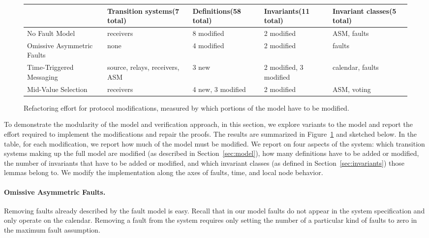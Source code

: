 \documentclass{llncs/llncs}
\newcommand{\lee}[1]{ } %
\newcommand{\lee}[1]{ {\color{blue}$<$lee: #1$>$} } %
\begin{document}
{\begin{figure}
  \centering
  \begin{tabular}{|p{3cm}|p{2cm}|p{2cm}|p{2cm}|p{2cm}|}
  \hline
                                  & Transition systems\linebreak (7 total)  &Definitions\linebreak (58 total) & Invariants\linebreak (11 total) & Invariant classes\linebreak (5 total) \\
  \hline \hline
  No Fault Model                  & receivers & 8 modified & 2 modified & ASM, faults \\
  \hline
  Omissive Asymmetric Faults       & none      & 4 modified & 2 modified & faults             \\
  \hline
  Time-Triggered Messaging        & source, relays, receivers, ASM & 3 new & 2 modified, 3 modified & calendar, faults \\
  \hline
  Mid-Value Selection & receivers & 4 new, 3 modified & 2 modified & ASM, voting \\
  \hline
  \end{tabular}
  \caption{Refactoring effort for protocol modifications, measured by which portions of the model have to be modified.}
  \label{fig:effort}
\end{figure}

To demonstrate the modularity of the model and verification approach, in this section, we explore variants to the model and report the effort required to implement the modifications and repair the proofs. The results are summarized in Figure~\ref{fig:effort} and sketched below. In the table, for each modification, we report how much of the model must be modified. We report on four aspects of the system: which transition systems making up the full model are modified (as described in Section~\ref{sec:model}), how many definitions have to be added or modified, the number of invariants that have to be added or modified, and which invariant classes (as defined in Section~\ref{sec:invariants}) those lemmas belong to. We modify the implementation along the axes of faults, time, and local node behavior.

\lee{no paragraph on no faults in table?}

\paragraph{Omissive Asymmetric Faults.}
Removing faults already described by the fault model is easy. Recall that in our model faults do not appear in the system specification and only operate on the calendar. Removing a fault from the system requires only setting the number of a particular kind of faults to zero in the maximum fault assumption.

}
\end{document}
